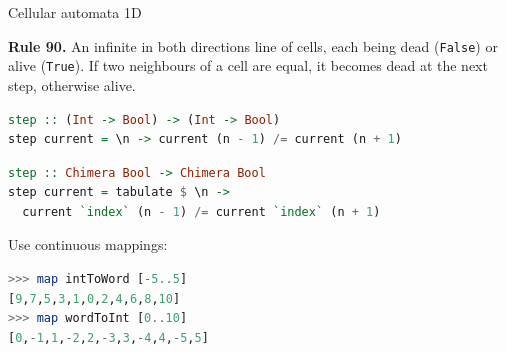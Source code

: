 \documentclass[handout]{beamer}
\begin{document}







\begin{frame}[fragile]{Cellular automata 1D}

{\bf Rule 90.}
An infinite in both directions line of cells, each being dead ({\tt False}) or alive ({\tt True}). If two neighbours of a cell are equal, it becomes dead at the next step, otherwise alive.

\begin{lstlisting}[language=Haskell]
step :: (Int -> Bool) -> (Int -> Bool)
step current = \n -> current (n - 1) /= current (n + 1)
\end{lstlisting}

\begin{lstlisting}[language=Haskell]
step :: Chimera Bool -> Chimera Bool
step current = tabulate $ \n ->
  current `index` (n - 1) /= current `index` (n + 1)
\end{lstlisting}

Use continuous mappings:

\begin{lstlisting}[language=Haskell]
>>> map intToWord [-5..5]
[9,7,5,3,1,0,2,4,6,8,10]
>>> map wordToInt [0..10]
[0,-1,1,-2,2,-3,3,-4,4,-5,5]
\end{lstlisting}

\end{frame}
\end{document}
